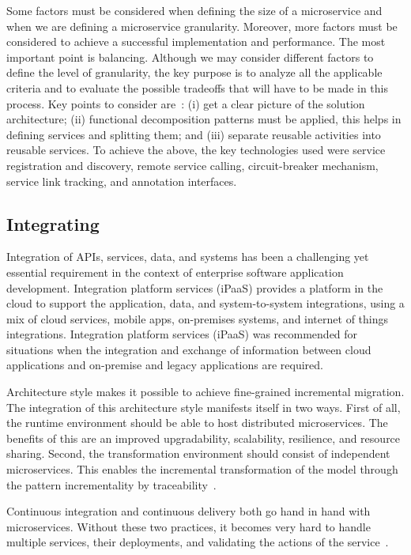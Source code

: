 Some factors must be considered when defining the size of a microservice and when we are defining a microservice granularity. Moreover, more factors must be considered to achieve a successful implementation and performance.
The most important point is balancing. Although we may consider different factors to define the level of granularity, the key purpose is to analyze all the applicable criteria and to evaluate the possible tradeoffs that will have to be made in this process. Key points to consider are~\cite{Yan2020}:
(i) get a clear picture of the solution architecture;
(ii) functional decomposition patterns must be applied, this helps in defining services and splitting them;
and (iii) separate reusable activities into reusable services.
%
To achieve the above, the key technologies used were service registration and discovery, remote service calling, circuit-breaker mechanism, service link tracking, and annotation interfaces.


\subsection{Integrating}%
Integration of APIs, services, data, and systems has been a challenging yet essential requirement in the context of enterprise software application development. %
Integration platform services (iPaaS) provides a platform in the cloud to support the application, data, and system-to-system integrations, using a mix of cloud services, mobile apps, on-premises systems, and internet of things integrations. 
%
Integration platform services (iPaaS) was recommended for situations when the integration and exchange of information between cloud applications and on-premise and legacy applications are required\cite{rosa2018}.

Architecture style makes it possible to achieve fine-grained incremental migration. The integration of this architecture style manifests itself in two ways. First of all, the runtime environment should be able to host distributed microservices. The benefits of this are an improved upgradability, scalability, resilience, and resource sharing.
Second, the transformation environment should consist of independent microservices. This enables the incremental transformation of the model through the pattern incrementality by traceability~\cite{liu2018, overeem2018}.

Continuous integration and continuous delivery both go hand in hand with microservices. Without these two practices, it becomes very hard to handle multiple services, their deployments, and validating the actions of the service~\cite{Zhang2019, Kalske2017paper}. 





